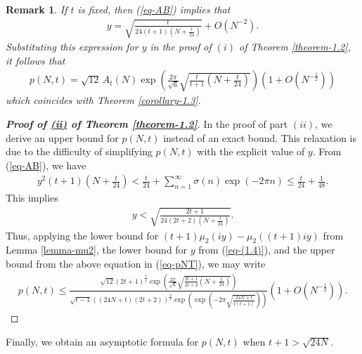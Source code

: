 \documentclass[11pt]{amsart}
\theoremstyle{plain}
\newtheorem{remark}[]{Remark}
\numberwithin{equation}{section}
\begin{document}
		\begin{remark}
			If $t$ is fixed, then (\ref{eq-AB}) implies that
			\begin{align*}
				y= \sqrt{\frac{t}{24(t+1)\left(N + \frac{t}{24}\right)}}+O\left(N^{-2}\right).    
			\end{align*}
			Substituting this expression for $y$ in the proof of $(i)$ of Theorem \ref{theorem-1.2}, it follows that
			\begin{align*}
				p(N,t) = \sqrt{12}\,A_{t}(N)
				\exp\left(\frac{2\pi}{\sqrt{6}} \sqrt{\frac{t}{t+1} \left(N + \frac{t}{24}\right)}\right) 
				\left(1 + O\left(N^{-\frac{1}{2}}\right)\right)  
			\end{align*}
			which coincides with Theorem \ref{corollary-1.3}.
		\end{remark}
		\begin{proof}[\textbf{\boldmath Proof of \hyperlink{thm1.2ii}{{(ii)}} of Theorem \ref{theorem-1.2}}]  In the proof of part $(ii)$, we derive an upper bound for $p(N,t)$ instead of an exact bound. This relaxation is due to the difficulty of simplifying $p(N,t)$ with the explicit value of $y$. From (\ref{eq-AB}), we have
			\begin{align*}
				y^{2}(t+1)\left(N+\frac{t}{24}\right)<\frac{t}{24}+\sum_{n=1}^{\infty}\sigma(n)\exp(-2\pi n)\le \frac{t}{24}+\frac{1}{48}. 
			\end{align*}
			This implies 
			\begin{align*}
				y<\sqrt{\frac{2t+1}{24(2t+2)\left(N+\frac{t}{24}\right)}}.  
			\end{align*}
			Thus, applying the lower bound for $(t+1)\mu_2(iy)-\mu_2((t+1)iy)$ from Lemma \ref{lemma-mu2}, the lower bound for $y$ from (\ref{eq-(1.4)}), and the upper bound from the above equation in (\ref{eq-pNT}), we may write 
			\begin{align*}
				p(N,t)\le \frac{\sqrt{12}(2t+1)^{\frac{3}{4}}\exp\left(\frac{2\pi}{\sqrt{6}}\sqrt{\frac{2t+1}{2t+2}\left(N+\frac{t}{24}\right)}\right)}{\sqrt{t-1}\left((24N+t)(2t+2)\right)^{\frac{3}{4}}\exp\left(\exp\left(-2\pi\sqrt{\frac{24N+t}{t(t+1)}}\right)\right)}\left(1+O\left(N^{-\frac{1}{2}}\right)\right).  
			\end{align*}
		\end{proof}
		Finally, we obtain an asymptotic formula for $p(N,t)$ when
		$t+1 > \sqrt{24N}$.
\end{document}
